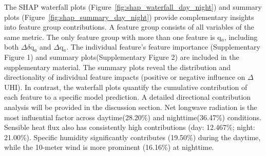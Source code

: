 \bgroup
{}
\begin{figure*}[!htbp]
\centering \makeatletter{}
\makeatother 
\caption{{\textbf{SHAP summary plots showing the distribution and magnitude of feature group impacts}. (a (daytime), b (nighttime)) Each point represents a single instance; the horizontal position indicates the SHAP value (positive values denote an increase in predicted \ensuremath{\Delta }UHI, negative a decrease); the color represents the original feature values (blue: low, red: high).}}
\label{fig:shap_summary_day_night}
\end{figure*}
\egroup
The SHAP waterfall plots (Figure~\ref{fig:shap_waterfall_day_night}) and summary plots (Figure~\ref{fig:shap_summary_day_night}) provide complementary insights into feature group contributions. A feature group consists of all variables of the same metric. The only feature group with more than one feature is q\ensuremath{_{a}}, including both \ensuremath{\Delta }\ensuremath{\delta }q\ensuremath{_{a}} and \ensuremath{\Delta }q\ensuremath{_{a}}. The individual feature's feature importance (Supplementary Figure 1) and summary plots(Supplementary Figure 2) are included in the supplementary material. The summary plots reveal the distribution and directionality of individual feature impacts (positive or negative influence on \ensuremath{\Delta }UHI). \mbox{}\protect\newline In contrast, the waterfall plots quantify the cumulative contribution of each feature to a specific model prediction. A detailed directional contribution analysis will be provided in the discussion section. Net longwave radiation is the most influential factor across daytime(28.20\%) and nighttime(36.47\%) conditions. Sensible heat flux also has consistently high contributions (day: 12.467\%; night: 21.00\%). Specific humidity significantly contributes (19.50\%) during the daytime, while the 10-meter wind is more prominent (16.16\%) at nighttime.



